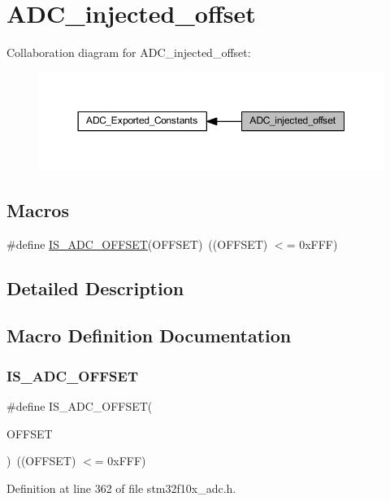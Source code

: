 \hypertarget{group___a_d_c__injected__offset}{}\section{A\+D\+C\+\_\+injected\+\_\+offset}
\label{group___a_d_c__injected__offset}
Collaboration diagram for A\+D\+C\+\_\+injected\+\_\+offset\+:
\nopagebreak
\begin{figure}[H]
\begin{center}
\leavevmode
\includegraphics[width=350pt]{group___a_d_c__injected__offset}
\end{center}
\end{figure}
\subsection*{Macros}
\begin{DoxyCompactItemize}
\item 
\#define \hyperlink{group___a_d_c__injected__offset_ga252eaf5d2552f0d11b1bcca7dc48950a}{I\+S\+\_\+\+A\+D\+C\+\_\+\+O\+F\+F\+S\+ET}(O\+F\+F\+S\+ET)~((O\+F\+F\+S\+ET) $<$= 0x\+F\+F\+F)
\end{DoxyCompactItemize}


\subsection{Detailed Description}


\subsection{Macro Definition Documentation}
\mbox{\label{group___a_d_c__injected__offset_ga252eaf5d2552f0d11b1bcca7dc48950a}} 
\subsubsection{\texorpdfstring{I\+S\+\_\+\+A\+D\+C\+\_\+\+O\+F\+F\+S\+ET}{IS\_ADC\_OFFSET}}
{\footnotesize\ttfamily \#define I\+S\+\_\+\+A\+D\+C\+\_\+\+O\+F\+F\+S\+ET(\begin{DoxyParamCaption}\item[{}]{O\+F\+F\+S\+ET }\end{DoxyParamCaption})~((O\+F\+F\+S\+ET) $<$= 0x\+F\+F\+F)}



Definition at line 362 of file stm32f10x\+\_\+adc.\+h.

